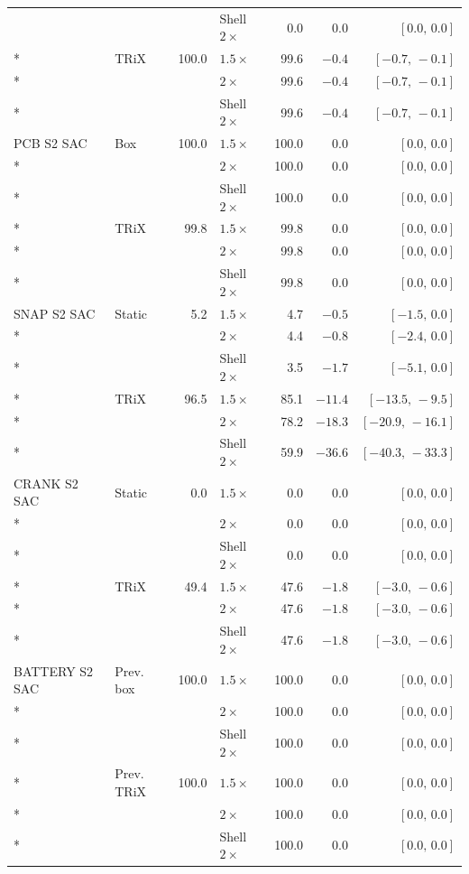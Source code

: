 \begin{longtable}{@{}llrlrrr@{}}
 &  &  & Shell $2\times$ & 0.0 & $0.0$ & $[0.0,\,0.0]$\\*
\addlinespace[2pt]
 & TRiX & 100.0 & $1.5\times$ & 99.6 & $-0.4$ & $[-0.7,\,-0.1]$\\*
 &  &  & $2\times$ & 99.6 & $-0.4$ & $[-0.7,\,-0.1]$\\*
 &  &  & Shell $2\times$ & 99.6 & $-0.4$ & $[-0.7,\,-0.1]$\\
\midrule
PCB S2 SAC & Box & 100.0 & $1.5\times$ & 100.0 & $0.0$ & $[0.0,\,0.0]$\\*
 &  &  & $2\times$ & 100.0 & $0.0$ & $[0.0,\,0.0]$\\*
 &  &  & Shell $2\times$ & 100.0 & $0.0$ & $[0.0,\,0.0]$\\*
\addlinespace[2pt]
 & TRiX & 99.8 & $1.5\times$ & 99.8 & $0.0$ & $[0.0,\,0.0]$\\*
 &  &  & $2\times$ & 99.8 & $0.0$ & $[0.0,\,0.0]$\\*
 &  &  & Shell $2\times$ & 99.8 & $0.0$ & $[0.0,\,0.0]$\\
\midrule
SNAP S2 SAC & Static & 5.2 & $1.5\times$ & 4.7 & $-0.5$ & $[-1.5,\,0.0]$\\*
 &  &  & $2\times$ & 4.4 & $-0.8$ & $[-2.4,\,0.0]$\\*
 &  &  & Shell $2\times$ & 3.5 & $-1.7$ & $[-5.1,\,0.0]$\\*
\addlinespace[2pt]
 & TRiX & 96.5 & $1.5\times$ & 85.1 & $-11.4$ & $[-13.5,\,-9.5]$\\*
 &  &  & $2\times$ & 78.2 & $-18.3$ & $[-20.9,\,-16.1]$\\*
 &  &  & Shell $2\times$ & 59.9 & $-36.6$ & $[-40.3,\,-33.3]$\\
\midrule
CRANK S2 SAC & Static & 0.0 & $1.5\times$ & 0.0 & $0.0$ & $[0.0,\,0.0]$\\*
 &  &  & $2\times$ & 0.0 & $0.0$ & $[0.0,\,0.0]$\\*
 &  &  & Shell $2\times$ & 0.0 & $0.0$ & $[0.0,\,0.0]$\\*
\addlinespace[2pt]
 & TRiX & 49.4 & $1.5\times$ & 47.6 & $-1.8$ & $[-3.0,\,-0.6]$\\*
 &  &  & $2\times$ & 47.6 & $-1.8$ & $[-3.0,\,-0.6]$\\*
 &  &  & Shell $2\times$ & 47.6 & $-1.8$ & $[-3.0,\,-0.6]$\\
\midrule
BATTERY S2 SAC & Prev. box & 100.0 & $1.5\times$ & 100.0 & $0.0$ & $[0.0,\,0.0]$\\*
 &  &  & $2\times$ & 100.0 & $0.0$ & $[0.0,\,0.0]$\\*
 &  &  & Shell $2\times$ & 100.0 & $0.0$ & $[0.0,\,0.0]$\\*
\addlinespace[2pt]
 & Prev. TRiX & 100.0 & $1.5\times$ & 100.0 & $0.0$ & $[0.0,\,0.0]$\\*
 &  &  & $2\times$ & 100.0 & $0.0$ & $[0.0,\,0.0]$\\*
 &  &  & Shell $2\times$ & 100.0 & $0.0$ & $[0.0,\,0.0]$\\
\bottomrule\end{longtable}\endgroup

